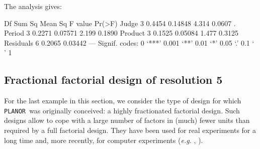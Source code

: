 \documentclass[a4paper]{article}
\newcommand{\PLANOR}{\texttt{PLANOR }}
\begin{document}
The analysis gives:
\begin{Schunk}
\begin{Soutput}
            Df Sum Sq Mean Sq F value Pr(>F)  
Judge        3 0.4454 0.14848   4.314 0.0607 .
Period       3 0.2271 0.07571   2.199 0.1890  
Product      3 0.1525 0.05084   1.477 0.3125  
Residuals    6 0.2065 0.03442                 
---
Signif. codes:  0 ‘***’ 0.001 ‘**’ 0.01 ‘*’ 0.05 ‘.’ 0.1 ‘ ’ 1
\end{Soutput}
\end{Schunk}

\subsection{Fractional factorial design of resolution 5}
For the last example in this section, we consider the type of design
for which \PLANOR was originally conceived: a highly fractionated
factorial design. Such designs allow to cope with a large number of
factors in (much) fewer units than required by a full factorial
design. They have been used for real experiments for a long time
\cite{boxhun78} and, more recently, for computer experiments
(\emph{e.g.} \cite{coumon11}, \cite{lurtou09}).
\end{document}
